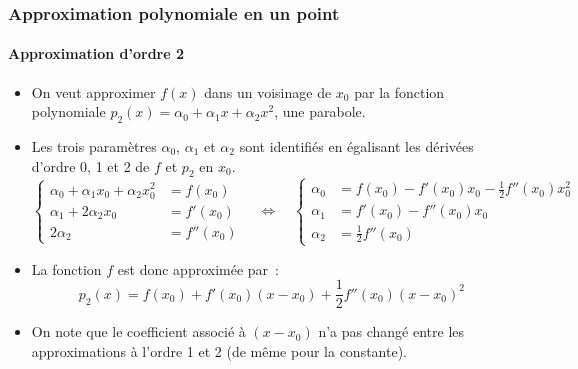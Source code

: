\documentclass[10pt,notheorems]{beamer}
\theoremstyle{plain}
\theoremstyle{definition} %
\begin{document}
\begin{frame}
  \frametitle{Approximation polynomiale en un point}
  \framesubtitle{Approximation d'ordre 2}
  \hypertarget{slide_taylor_5}{}

  \bigskip

  \begin{itemize}

  \item On veut approximer $f(x)$ dans un voisinage de $x_0$ par la fonction polynomiale $p_2(x) = \alpha_0+\alpha_1 x + \alpha_2 x^2$, une parabole.\newline

  \item Les trois paramètres $\alpha_0$, $\alpha_1$ et $\alpha_2$ sont identifiés en égalisant les dérivées d'ordre 0, 1 et 2 de $f$ et $p_2$ en $x_0$.\newline
    {\small
      \[
        \begin{cases}
          \alpha_0+\alpha_1x_0+\alpha_2x_0^2 &= f(x_0)\\
          \alpha_1+2\alpha_2x_0 &= f'(x_0)\\
          2\alpha_2 &= f''(x_0)
        \end{cases}
        \quad\Leftrightarrow\quad
        \begin{cases}
          \alpha_0 &= f(x_0)-f'(x_0)x_0-\frac{1}{2}f''(x_0)x_0^2\\
          \alpha_1 &= f'(x_0)-f''(x_0)x_0\\
          \alpha_2 &= \frac{1}{2}f''(x_0)
        \end{cases}
      \]}

    \medskip

  \item La fonction $f$ est donc approximée par~:
    \[
      p_2(x) = f(x_0) + f'(x_0)(x-x_0) + \frac{1}{2}f''(x_0)(x-x_0)^2
    \]

    \medskip

  \item On note que le coefficient associé à $(x-x_0)$ n'a pas changé
    entre les approximations à l'ordre 1 et 2 (de même pour la
    constante).

  \end{itemize}

\end{frame}
\end{document}
